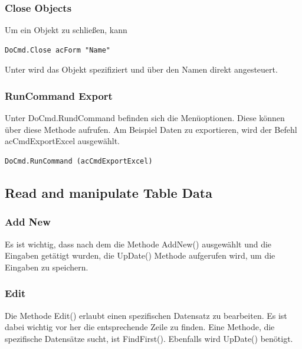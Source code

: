 \subsubsection{Close Objects}
Um ein Objekt zu schließen, kann 
\begin{lstlisting}[style=VBA]
	DoCmd.Close acForm "Name"
\end{lstlisting}  
Unter  wird das Objekt spezifiziert und über den Namen direkt angesteuert.

\subsubsection{RunCommand Export}
Unter DoCmd.RundCommand befinden sich die Menüoptionen. Diese können über diese Methode aufrufen. Am Beispiel Daten zu exportieren, wird der Befehl acCmdExportExcel ausgewählt.

\begin{lstlisting}[style=VBA]
	DoCmd.RunCommand (acCmdExportExcel)
\end{lstlisting}  
\subsection{Read and manipulate Table Data}
\subsubsection{Add New}
Es ist wichtig, dass nach dem die Methode AddNew() ausgewählt und die Eingaben getätigt wurden, die UpDate() Methode aufgerufen wird, um die Eingaben zu speichern.
\subsubsection{Edit}
Die Methode Edit() erlaubt einen spezifischen Datensatz zu bearbeiten. Es ist dabei wichtig vor her die entsprechende Zeile zu finden. Eine Methode, die spezifische Datensätze sucht, ist FindFirst(). 
Ebenfalls wird UpDate() benötigt.
